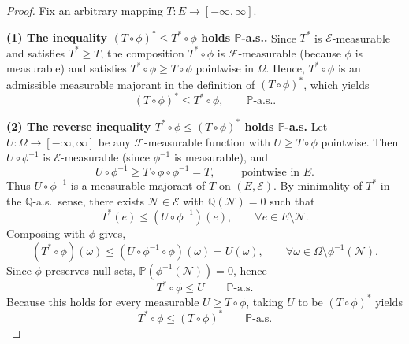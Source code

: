 \documentclass[12pt]{article}
\renewcommand{\(}{\left(}%
\renewcommand{\)}{\right)}%
\renewcommand{\[}{\left[}%
\renewcommand{\]}{\right]}%
\newcommand{\p}{\mathbb{P}}
\newcommand{\f}{\mathscr{F}}
\newtheorem{proof}{Proof.}}
\begin{document}
\begin{proof}
Fix an arbitrary mapping $T: E \to[-\infty,\infty]$.

\medskip
\noindent
\textbf{(1) The inequality $(T\circ\phi)^*\le T^*\circ\phi$ holds $\p$-a.s..}
Since $T^*$ is $\mathscr{E}$-measurable and satisfies $T^*\ge T$, the composition
$T^*\circ\phi$ is $\f $-measurable (because $\phi$ is measurable) and satisfies
$T^*\circ\phi\ge T\circ\phi$ pointwise in $\Omega$. Hence, $T^*\circ\phi$ is an admissible measurable majorant
in the definition of $(T\circ\phi)^*$, which yields
\begin{equation*}
(T\circ\phi)^*\le T^*\circ\phi,\qquad \p\text{-a.s.}.
\end{equation*}

\medskip
\noindent
\textbf{(2) The reverse inequality $T^*\circ\phi\le (T\circ\phi)^*$ holds $\p $-a.s.}
Let $U:\Omega \to[-\infty,\infty]$ be any $\f $-measurable function with
$U\ge T\circ\phi$ pointwise.
Then $U\circ\phi^{-1}$ is $\mathscr{E}$-measurable (since $\phi^{-1}$ is measurable), and 
\begin{equation*}
U\circ\phi^{-1}\ge T\circ\phi\circ\phi^{-1}=T,\qquad\text{ pointwise in }E .
\end{equation*}
Thus $U\circ\phi^{-1}$ is a measurable majorant of $T$ on $( E ,\mathscr{E})$.
By minimality of $T^*$ in the $\mathbb Q$-a.s.\ sense, there exists $\mathscr{N}\in\mathscr{E}$ with
$\mathbb{Q}(\mathscr{N})=0$ such that
\begin{equation*}
T^*( e)\le (U\circ\phi^{-1})( e ),\qquad \forall  e \in E \setminus \mathscr{N}.
\end{equation*}
Composing with $\phi$ gives, 
\begin{equation*}
(T^*\circ\phi)(\omega )\le (U\circ\phi^{-1}\circ\phi)(\omega )=U(\omega ),\qquad\forall \omega \in\Omega \setminus\phi^{-1}(\mathscr{N}).
\end{equation*}
Since $\phi$ preserves null sets, $\p (\phi^{-1}(\mathscr{N}))=0$, hence
\begin{equation*}
T^*\circ\phi \le U \qquad \p \text{-a.s.}
\end{equation*}
Because this holds for every measurable $U\ge T\circ\phi$, taking $U$ to be $(T\circ \phi)^*$
yields
\begin{equation*}
T^*\circ\phi \le (T\circ\phi)^* \qquad \p \text{-a.s.}
\end{equation*}
\end{proof}
  
\end{document}
